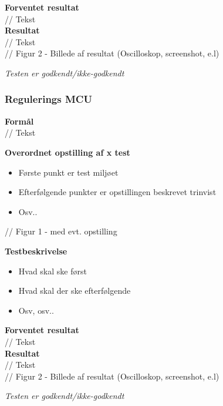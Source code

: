 \textbf{Forventet resultat} \\
// Tekst \\
\textbf{Resultat} \\
// Tekst \\

// Figur 2 - Billede af resultat (Oscilloskop, screenshot, e.l)

\textit{Testen er godkendt/ikke-godkendt}
\subsubsection{Regulerings MCU}
\textbf{Formål} \\
// Tekst

\textbf{Overordnet opstilling af x test}

\begin{itemize}
	\item Første punkt er test miljøet
	\item Efterfølgende punkter er opstillingen beskrevet trinvist
	\item Osv..
\end{itemize}

// Figur 1 - med evt. opstilling

\textbf{Testbeskrivelse}
\begin{itemize}
	\item Hvad skal ske først
	\item Hvad skal der ske efterfølgende
	\item Osv, osv..
\end{itemize}

\textbf{Forventet resultat} \\
// Tekst \\
\textbf{Resultat} \\
// Tekst \\

// Figur 2 - Billede af resultat (Oscilloskop, screenshot, e.l)

\textit{Testen er godkendt/ikke-godkendt}
